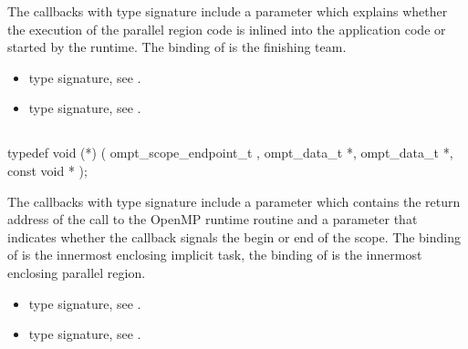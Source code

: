 \descr
The callbacks with type signature 
include a parameter  which explains whether the execution of the parallel
region code is inlined into the application code or started by the runtime.
The binding of  is the finishing team.


\crossreferences
\begin{itemize}
\item {} type signature, see
.
\item {} type signature, see
.
\end{itemize}

\subsection{}
\label{subsec:ompt_scoped_master_callback_t}
\format
\begin{boxedcode}
typedef void (*) (
               ompt\_scope\_endpoint\_t ,
               ompt\_data\_t *,
               ompt\_data\_t *,
               const void *
);
\end{boxedcode}

\descr
The callbacks with type signature 
include a parameter  which contains the return address of the
call to the OpenMP runtime routine and a parameter 
that indicates whether the callback signals the begin or end of the scope.
The binding of  is the innermost enclosing implicit task,
the binding of  is the innermost enclosing parallel region.


\crossreferences
\begin{itemize}
\item {} type signature, see
.
\item {} type signature, see
.
\end{itemize}





